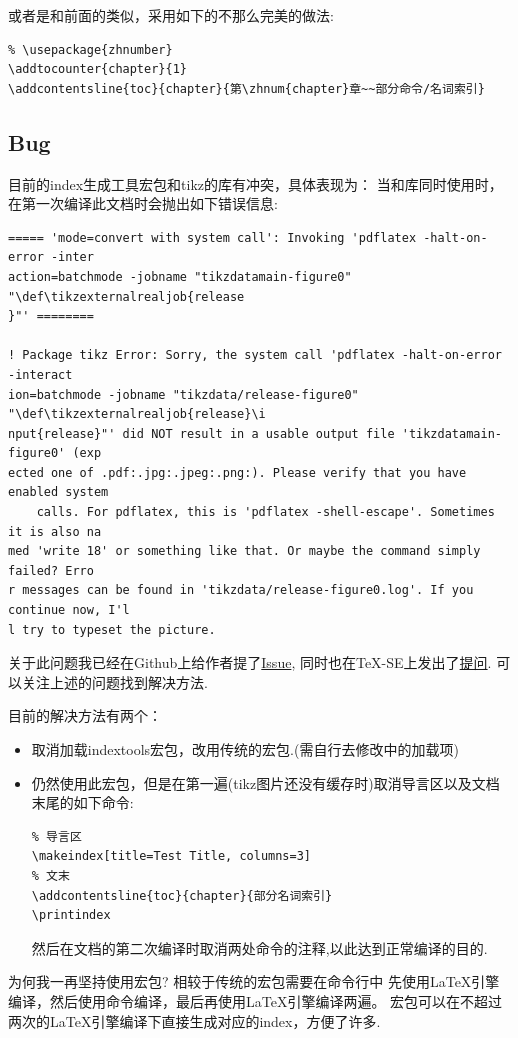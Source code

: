 或者是和前面的\cmd{\printbibliography}类似，采用如下的不那么完美的做法:
\begin{verbatim}
% \usepackage{zhnumber}
\addtocounter{chapter}{1}
\addcontentsline{toc}{chapter}{第\zhnum{chapter}章~~部分命令/名词索引}
\end{verbatim}

\subsection{Bug}
目前的index生成工具宏包和tikz的库有冲突，具体表现为：
当和库同时使用时，在第一次编译此文档时会抛出如下错误信息:

\begin{verbatim}
===== 'mode=convert with system call': Invoking 'pdflatex -halt-on-error -inter
action=batchmode -jobname "tikzdatamain-figure0" "\def\tikzexternalrealjob{release
}"' ========

! Package tikz Error: Sorry, the system call 'pdflatex -halt-on-error -interact
ion=batchmode -jobname "tikzdata/release-figure0" "\def\tikzexternalrealjob{release}\i
nput{release}"' did NOT result in a usable output file 'tikzdatamain-figure0' (exp
ected one of .pdf:.jpg:.jpeg:.png:). Please verify that you have enabled system
    calls. For pdflatex, this is 'pdflatex -shell-escape'. Sometimes it is also na
med 'write 18' or something like that. Or maybe the command simply failed? Erro
r messages can be found in 'tikzdata/release-figure0.log'. If you continue now, I'l
l try to typeset the picture.
\end{verbatim}

关于此问题我已经在Github上给作者提了\href{https://github.com/maieul/indextools/issues/17}{Issue},
同时也在\TeX-SE上发出了\href{https://tex.stackexchange.com/questions/712716/indextools-confilict-with-tikz-library-external}{提问}.
可以关注上述的问题找到解决方法.

目前的解决方法有两个：
\begin{itemize}
    \item 取消加载indextools宏包，改用传统的宏包.(需自行去修改中的加载项)
    \item 仍然使用此宏包，但是在第一遍(tikz图片还没有缓存时)取消导言区以及文档末尾的如下命令:
\begin{verbatim}
% 导言区
\makeindex[title=Test Title, columns=3]
% 文末
\addcontentsline{toc}{chapter}{部分名词索引}
\printindex
\end{verbatim}
        然后在文档的第二次编译时取消两处命令的注释,以此达到正常编译的目的.
\end{itemize}

\begin{leftbar}
\noindent 为何我一再坚持使用宏包? 相较于传统的宏包需要在命令行中
先使用\LaTeX{}引擎编译，然后使用命令编译，最后再使用\LaTeX{}引擎编译两遍。
宏包可以在不超过两次的\LaTeX{}引擎编译下直接生成对应的index，方便了许多.
\end{leftbar}